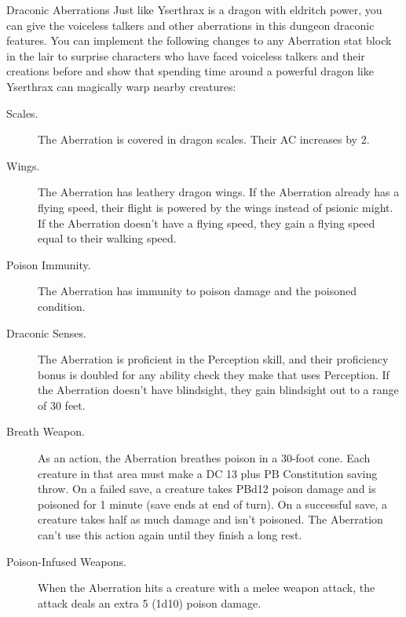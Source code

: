 \documentclass[10pt,a4paper,twoside,bg=print,twocolumn,openany,nodeprecatedcode]{dndbook}
\begin{document}
\begin{DndSidebar}[float=!b]{Draconic Aberrations}
Just like Yserthrax is a dragon with eldritch power, you can give the voiceless talkers and other aberrations in this dungeon draconic features. You can implement the following changes to any Aberration stat block in the lair to surprise characters who have faced voiceless talkers and their creations before and show that spending time around a powerful dragon like Yserthrax can magically warp nearby creatures:




\begin{description}
\item[Scales.]
The Aberration is covered in dragon scales. Their AC increases by 2.

\item[Wings.]
The Aberration has leathery dragon wings. If the Aberration already has a flying speed, their flight is powered by the wings instead of psionic might. If the Aberration doesn't have a flying speed, they gain a flying speed equal to their walking speed.

\item[Poison Immunity.]
The Aberration has immunity to poison damage and the poisoned condition.

\item[Draconic Senses.]
The Aberration is proficient in the Perception skill, and their proficiency bonus is doubled for any ability check they make that uses Perception. If the Aberration doesn't have blindsight, they gain blindsight out to a range of 30 feet.

\item[Breath Weapon.]
As an action, the Aberration breathes poison in a 30-foot cone. Each creature in that area must make a DC 13 plus PB Constitution saving throw. On a failed save, a creature takes PBd12 poison damage and is poisoned for 1 minute (save ends at end of turn). On a successful save, a creature takes half as much damage and isn't poisoned. The Aberration can't use this action again until they finish a long rest.

\item[Poison-Infused Weapons.]
When the Aberration hits a creature with a melee weapon attack, the attack deals an extra 5 (1d10) poison damage.

\end{description}



\end{DndSidebar}
\end{document}
